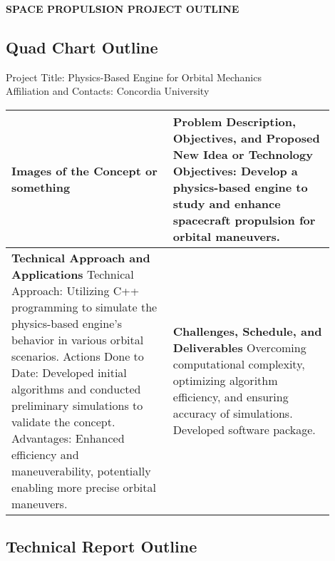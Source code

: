 \documentclass[18pt, letter]{article}
\begin{document}
\thispagestyle{empty}
\begin{center}
    \Large{\textbf{SPACE PROPULSION PROJECT OUTLINE}}
\end{center}

\vspace{20pt}



\begin{center}
    \section*{Quad Chart Outline}
\end{center}

Project Title: Physics-Based Engine for Orbital Mechanics \\

Affiliation and Contacts: Concordia University \\


\begin{table}[h]
    \centering
    \begin{tabular}{|p{0.45\linewidth}|p{0.45\linewidth}|}
    \hline
    \textbf{Images of the Concept or something} & \textbf{Problem Description, Objectives, and Proposed New Idea or Technology}
 \newline 
    Objectives: Develop a physics-based engine to study and enhance spacecraft propulsion for orbital maneuvers.\\
    \hline

    
    \textbf{Technical Approach and Applications} 
    \newline Technical Approach: Utilizing C++ programming to simulate the physics-based engine's behavior in various orbital scenarios.
\newline Actions Done to Date: Developed initial algorithms and conducted preliminary simulations to validate the concept.
\newline Advantages: Enhanced efficiency and maneuverability, potentially enabling more precise orbital maneuvers.
 & \textbf{Challenges, Schedule, and Deliverables} \newline Overcoming computational complexity, optimizing algorithm efficiency, and ensuring accuracy of simulations. \newline Developed software package. \\
    \hline
    \end{tabular}
\end{table}


\clearpage
\begin{center}
    \section*{Technical Report Outline}
\end{center}
\end{document}

